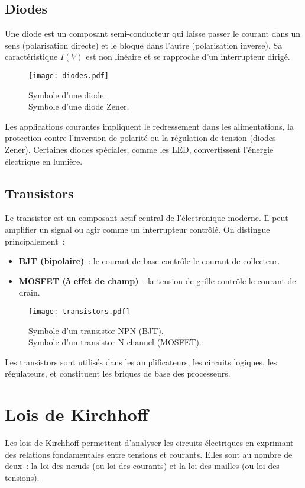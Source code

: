 \subsection{Diodes} \label{subsec:diodes}
Une diode est un composant semi-conducteur qui laisse passer le courant dans un sens (polarisation directe) et le bloque dans l'autre (polarisation inverse). Sa caract\'eristique \(I(V)\) est non lin\'eaire et se rapproche d'un interrupteur dirig\'e.
\begin{figure}[H]
    \centering
    \texttt{[image: diodes.pdf]}
    \caption{\newline
         Symbole d'une diode.\\
         Symbole d'une diode Zener.
    }
\end{figure}
Les applications courantes impliquent le redressement dans les alimentations, la protection contre l'inversion de polarit\'e ou la r\'egulation de tension (diodes Zener). Certaines diodes sp\'eciales, comme les LED, convertissent l'\'energie \'electrique en lumi\`ere.

\subsection{Transistors} \label{subsec:transistors}
Le transistor est un composant actif central de l'\'electronique moderne. Il peut amplifier un signal ou agir comme un interrupteur contrôl\'e. On distingue principalement~:
\begin{itemize}
  \item \textbf{BJT (bipolaire)}~: le courant de base contrôle le courant de collecteur.
  \item \textbf{MOSFET (à effet de champ)}~: la tension de grille contrôle le courant de drain.
\end{itemize}
\begin{figure}[H]
    \centering
    \texttt{[image: transistors.pdf]}
    \caption{\centering\newline
         Symbole d'un transistor NPN (BJT).\\
         Symbole d'un transistor N-channel (MOSFET).
    }
\end{figure}
Les transistors sont utilis\'es dans les amplificateurs, les circuits logiques, les r\'egulateurs, et constituent les briques de base des processeurs.

\section{Lois de Kirchhoff} \label{subsec:kirchhoff}
Les lois de Kirchhoff permettent d'analyser les circuits \'electriques en exprimant des relations fondamentales entre tensions et courants. Elles sont au nombre de deux~: la loi des nœuds (ou loi des courants) et la loi des mailles (ou loi des tensions).
